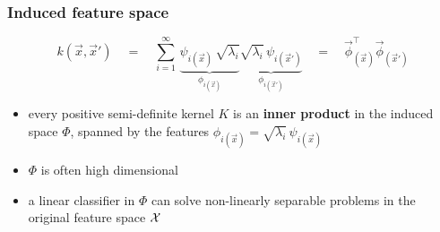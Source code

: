\begin{frame}\frametitle{Induced feature space}
	$$
			k(\vec x, \vec x') 
			\quad=\quad 
			\sum_{i=1}^{\infty} \,
			\underbrace{\psi_{i(\vec x)} \, \sqrt{\lambda_i}}_{\phi_{i(\vec x)}}
			\underbrace{\sqrt{\lambda_i} \, \psi_{i(\vec x')} }_{\phi_{i(\vec x')}} 
			\quad=\quad \vec \phi_{(\vec x)}^\top \vec \phi_{(\vec x')}
	$$

	\begin{itemize}
		\item every positive semi-definite kernel $K$
			is an \textbf{inner product} in the induced space $\Phi$,
			spanned by the features
			$\phi_{i(\vec x)} = \sqrt{\lambda_i} \, \psi_{i(\vec x)}$
		\vspace{4mm}
		\item $\Phi$ is often high dimensional
		\vspace{4mm}
		\item a linear classifier in $\Phi$ can solve 
			non-linearly separable problems in the original feature space $\mathcal{X}$
	\end{itemize}
\end{frame}

